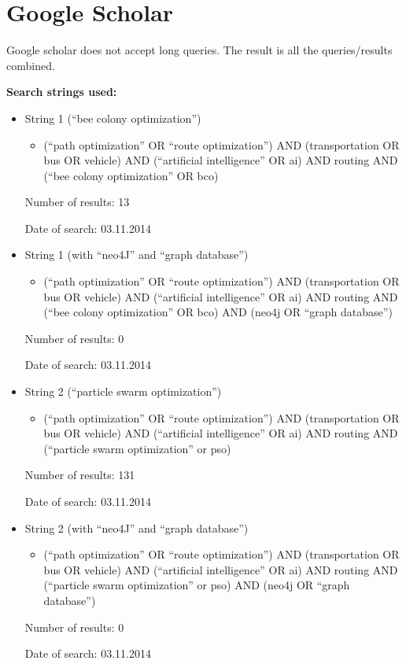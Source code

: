 \section{Google Scholar}
Google scholar does not accept long queries. The result is all the queries/results combined.
\par\par
\textbf{Search strings used:}
\begin{itemize}
\item String 1 (``bee colony optimization'')
\begin{itemize}
\item (``path optimization'' OR ``route optimization'') AND (transportation OR bus OR vehicle) AND (``artificial intelligence'' OR ai) AND routing AND (``bee colony optimization'' OR bco)
\end{itemize}
\par
Number of results: 13
\par
Date of search: 03.11.2014
\end{itemize}
\begin{itemize}
\item String 1 (with ``neo4J'' and ``graph database'')
\begin{itemize}
\item (``path optimization'' OR ``route optimization'') AND (transportation OR bus OR vehicle) AND (``artificial intelligence'' OR ai) AND routing AND (``bee colony optimization'' OR bco) AND (neo4j OR ``graph database'')
\end{itemize}
\par
Number of results: 0
\par
Date of search: 03.11.2014
\end{itemize}
\begin{itemize}
\item String 2 (``particle swarm optimization'')
\begin{itemize}
\item (``path optimization'' OR ``route optimization'') AND (transportation OR bus OR vehicle) AND (``artificial intelligence'' OR ai) AND routing AND (``particle swarm optimization'' or pso)
\end{itemize}
\par
Number of results: 131
\par
Date of search: 03.11.2014
\end{itemize}
\begin{itemize}
\item String 2 (with ``neo4J'' and ``graph database'')
\begin{itemize}
\item (``path optimization'' OR ``route optimization'') AND (transportation OR bus OR vehicle) AND (``artificial intelligence'' OR ai) AND routing AND (``particle swarm optimization'' or pso) AND (neo4j OR ``graph database'')
\end{itemize}
\par
Number of results: 0
\par
Date of search: 03.11.2014
\end{itemize}
